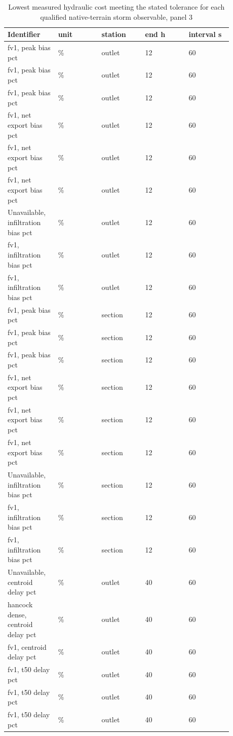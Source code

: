 \begin{longtable}{p{0.1760\linewidth}p{0.1760\linewidth}p{0.1760\linewidth}p{0.1760\linewidth}p{0.1760\linewidth}}
\caption{Lowest measured hydraulic cost meeting the stated tolerance for each qualified native-terrain storm observable, panel 3}\\
\hline
Identifier & unit & station & end h & interval s \\
\hline\endhead
fv1, peak bias pct & \% & outlet & 12 & 60 \\
fv1, peak bias pct & \% & outlet & 12 & 60 \\
fv1, peak bias pct & \% & outlet & 12 & 60 \\
fv1, net export bias pct & \% & outlet & 12 & 60 \\
fv1, net export bias pct & \% & outlet & 12 & 60 \\
fv1, net export bias pct & \% & outlet & 12 & 60 \\
Unavailable, infiltration bias pct & \% & outlet & 12 & 60 \\
fv1, infiltration bias pct & \% & outlet & 12 & 60 \\
fv1, infiltration bias pct & \% & outlet & 12 & 60 \\
fv1, peak bias pct & \% & section & 12 & 60 \\
fv1, peak bias pct & \% & section & 12 & 60 \\
fv1, peak bias pct & \% & section & 12 & 60 \\
fv1, net export bias pct & \% & section & 12 & 60 \\
fv1, net export bias pct & \% & section & 12 & 60 \\
fv1, net export bias pct & \% & section & 12 & 60 \\
Unavailable, infiltration bias pct & \% & section & 12 & 60 \\
fv1, infiltration bias pct & \% & section & 12 & 60 \\
fv1, infiltration bias pct & \% & section & 12 & 60 \\
Unavailable, centroid delay pct & \% & outlet & 40 & 60 \\
hancock dense, centroid delay pct & \% & outlet & 40 & 60 \\
fv1, centroid delay pct & \% & outlet & 40 & 60 \\
fv1, t50 delay pct & \% & outlet & 40 & 60 \\
fv1, t50 delay pct & \% & outlet & 40 & 60 \\
fv1, t50 delay pct & \% & outlet & 40 & 60 \\

\end{longtable}
